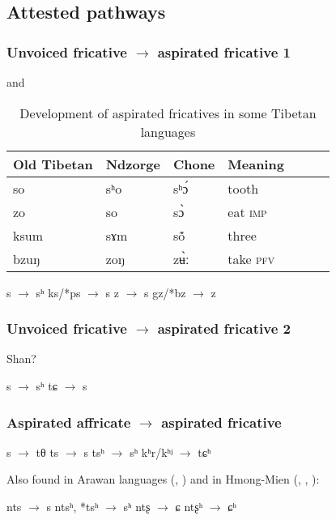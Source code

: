 \documentclass[oldfontcommands,oneside,a4paper,11pt]{article}
\newcommand{\ipa}[1]{{\phon \mbox{#1}}} %
\begin{document}
\subsection{Attested pathways}
 

\subsubsection{Unvoiced  fricative $\rightarrow$ aspirated fricative 1}

\citet{sun86ndzorge} and \citet{jacques14cone} 

\begin{table}[h] \centering
\caption{Development of aspirated fricatives in some Tibetan languages}  
\begin{tabular}{lllllll}
\toprule
Old Tibetan& Ndzorge& Chone & Meaning \\
\midrule

so & \ipa{sʰo}& \ipa{sʰɔ́} &tooth \\
zo & \ipa{so}& \ipa{sɔ̀} &eat \textsc{imp} \\
ksum & \ipa{sɤm}& \ipa{sṍ} &three \\
bzuŋ & \ipa{zoŋ}& \ipa{zʉ̀ː} &take \textsc{pfv}\\
\bottomrule
\end{tabular}
\end{table}
\begin{exe}
\ex 
\glt *s $\rightarrow$ sʰ
\glt *ks/*ps $\rightarrow$ s
\glt *z $\rightarrow$ s
\glt *gz/*bz $\rightarrow$ z
\end{exe}

\subsubsection{Unvoiced  fricative $\rightarrow$ aspirated fricative 2}
Shan?
\begin{exe}
\ex 
\glt *s $\rightarrow$ sʰ
\glt *tɕ $\rightarrow$ s
\end{exe}

\subsubsection{Aspirated affricate $\rightarrow$ aspirated fricative}
\begin{exe}
\ex 
\glt *s $\rightarrow$ tθ
\glt *ts $\rightarrow$ s
\glt *tsʰ $\rightarrow$ sʰ
\glt *kʰr/kʰʲ $\rightarrow$ tɕʰ
\end{exe}
\citet{wang79miaoyu}

Also found in Arawan languages (\citealt{dixon04arawa}, \citealt{dienst05kulina}) and in Hmong-Mien (\citealt{wang79miaoyu}, \citealt{ratliff10protohm}, \citealt{carveth13aspirated}):
\begin{exe}
\ex 
\glt *nts $\rightarrow$ s
\glt *ntsʰ, *tsʰ $\rightarrow$ sʰ
\glt *ntʂ $\rightarrow$ ɕ
\glt *ntʂʰ $\rightarrow$ ɕʰ
\end{exe}
\end{document}
